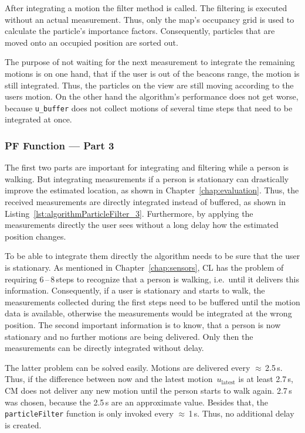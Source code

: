 After integrating a motion the filter method is called. The filtering is executed without an actual measurement. Thus, only the map's occupancy grid is used to calculate the particle's importance factors. Consequently, particles that are moved onto an occupied position are sorted out.

The purpose of not waiting for the next measurement to integrate the remaining motions is on one hand, that if the user is out of the beacons range, the motion is still integrated. Thus, the particles on the view are still moving according to the users motion. On the other hand the algorithm's performance does not get worse, because \texttt{u\_buffer} does not collect motions of several time steps that need to be integrated at once.




\subsubsection*{\acl{PF} Function --- Part 3}
The first two parts are important for integrating and filtering while a person is walking. But integrating measurements if a person is stationary can drastically improve the estimated location, as shown in Chapter~\ref{chap:evaluation}. Thus, the received measurements are directly integrated instead of buffered, as shown in Listing~\ref{lst:algorithmParticleFilter_3}. Furthermore, by applying the measurements directly the user sees without a long delay how the estimated position changes.

To be able to integrate them directly the algorithm needs to be sure that the user is stationary. As mentioned in Chapter~\ref{chap:sensors}, \acs{CL} has the problem of requiring 6\,--\,8\,steps to recognize that a person is walking, i.e.\ until it delivers this information. Consequently, if a user is stationary and starts to walk, the measurements collected during the first steps need to be buffered until the motion data is available, otherwise the measurements would be integrated at the wrong position. The second important information is to know, that a person is now stationary and no further motions are being delivered. Only then the measurements can be directly integrated without delay.

The latter problem can be solved easily. Motions are delivered every $\approx$\,2.5\,s. Thus, if the difference between now and the latest motion~$u_\text{latest}$ is at least 2.7\,s, \acs{CM} does not deliver any new motion until the person starts to walk again. 2.7\,s was chosen, because the 2.5\,s are an approximate value. Besides that, the \texttt{particleFilter} function is only invoked every $\approx$\,1\,s. Thus, no additional delay is created.

